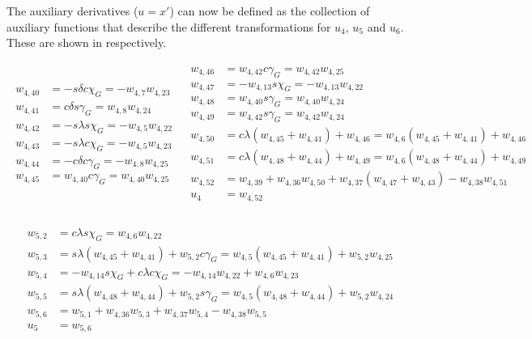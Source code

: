 \noindent
The auxiliary derivatives ($u = x'$) can now be defined as the collection of auxiliary functions that describe the different transformations for $u_{4}$, $u_{5}$ and $u_{6}$. These are shown in  respectively. 

\begin{align} \label{eq:u4AuxF}
\begin{split}
w_{4,40} &= -s\delta c\chi_{G} = -w_{4,7}w_{4,23} \\
w_{4,41} &= c\delta	s\gamma_{G} = w_{4,8}w_{4,24}\\
w_{4,42} &= -s\lambda s\chi_{G} = -w_{4,5}w_{4,22}\\
w_{4,43} &= -s\lambda c\chi_{G} = -w_{4,5}w_{4,23} \\
w_{4,44} &= -c\delta c\gamma_{G} = -w_{4,8}w_{4,25} \\
w_{4,45} &= w_{4,40} c\gamma_{G} = w_{4,40}w_{4,25} \\
\end{split}
&
\begin{split}
w_{4,46} &= w_{4,42} c\gamma_{G} = w_{4,42}w_{4,25} \\
w_{4,47} &= -w_{4,13} s\chi_{G} = -w_{4,13}w_{4,22} \\
w_{4,48} &= w_{4,40} s\gamma_{G} = w_{4,40}w_{4,24} \\
w_{4,49} &= w_{4,42} s\gamma_{G} = w_{4,42}w_{4,24} \\
w_{4,50} &= c\lambda \left(w_{4,45}+w_{4,41} \right) + w_{4,46} = 
w_{4,6}\left(w_{4,45}+w_{4,41} \right) + w_{4,46} \\
w_{4,51} &= c\lambda \left(w_{4,48}+w_{4,44} \right) + w_{4,49} =
w_{4,6}\left(w_{4,48}+w_{4,44} \right) + w_{4,49} \\
w_{4,52} &= w_{4,39} +w_{4,36}w_{4,50}+w_{4,37}\left(w_{4,47}+w_{4,43}\right)-w_{4,38}w_{4,51} \\
u_{4} &= w_{4,52} \\
\end{split}
\end{align}

\begin{align} \label{eq:u5AuxF}
\begin{split}
w_{5,2} &= c\lambda s\chi_{G} = w_{4,6}w_{4,22} \\
w_{5,3} &= s\lambda \left(w_{4,45}+w_{4,41}\right)+w_{5,2} c\gamma_{G} = w_{4,5} \left(w_{4,45}+w_{4,41}\right) +w_{5,2} w_{4,25} \\
w_{5,4} &= -w_{4,14} s\chi_{G}+c\lambda c\chi_{G} = -w_{4,14}w_{4,22}+w_{4,6}w_{4,23} \\
w_{5,5} &= s\lambda \left(w_{4,48}+w_{4,44}\right) + w_{5,2} s\gamma_{G} = w_{4,5} \left(w_{4,48}+w_{4,44}\right)+w_{5,2}w_{4,24} \\
w_{5,6} &= w_{5,1} + w_{4,36}w_{5,3}+w_{4,37}w_{5,4}-w_{4,38}w_{5,5} \\
u_{5} &= w_{5,6} \\
\end{split}
\end{align}

